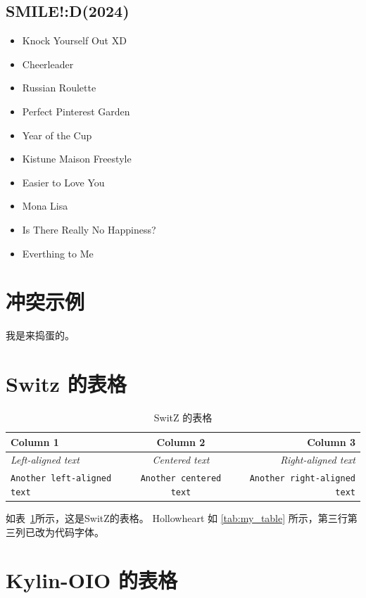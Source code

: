 \documentclass{article}
\begin{document}
\subsection{SMILE!:D(2024)}

\begin{itemize}
    \item Knock Yourself Out XD
    \item Cheerleader
    \item Russian Roulette
    \item Perfect Pinterest Garden
    \item Year of the Cup
    \item Kistune Maison Freestyle
    \item Easier to Love You
    \item Mona Lisa
    \item Is There Really No Happiness?
    \item Everthing to Me
\end{itemize}

\section{冲突示例}

我是来捣蛋的。

\section{ Switz 的表格}

\begin{table}[H]
    \centering
    \begin{tabular}{lcr}
        \toprule
        \textbf{Column 1}                  & \textbf{Column 2}              & \textbf{Column 3}                   \\
        \midrule
        \textit{Left-aligned text}         & \textit{Centered text}         & \textit{Right-aligned text}         \\
        \texttt{Another left-aligned text} & \texttt{Another centered text} & \texttt{Another right-aligned text} \\
        \bottomrule
    \end{tabular}
    \caption{SwitZ 的表格}
    \label{tab:switz}
\end{table}

如表~\ref{tab:switz}所示，这是SwitZ的表格。
Hollowheart
如 \ref{tab:my_table} 所示，第三行第三列已改为代码字体。

\section{ Kylin-OIO 的表格}
\end{document}
